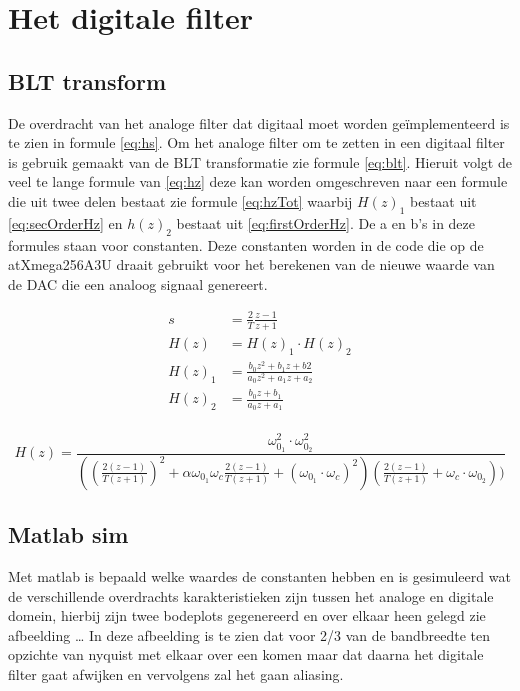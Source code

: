 \section{Het digitale filter}

\subsection{BLT transform}
\begin{minipage}{0.545\textwidth}
	De overdracht van het analoge filter dat digitaal moet worden geïmplementeerd is te zien in formule \ref{eq:hs}.
Om het analoge filter om te zetten in een digitaal filter is gebruik gemaakt van de BLT transformatie zie formule
\ref{eq:blt}. Hieruit volgt de veel te lange formule van \ref{eq:hz} deze kan worden omgeschreven naar een formule
die uit twee delen bestaat zie formule \ref{eq:hzTot} waarbij $H(z)_1$ bestaat uit \ref{eq:secOrderHz} en $h(z)_2$
bestaat uit \ref{eq:firstOrderHz}. De a en b's in deze formules staan voor constanten. Deze constanten worden
in de code die op de atXmega256A3U draait gebruikt voor het berekenen van de nieuwe waarde van de DAC die een 
analoog signaal genereert.
\end{minipage}
\begin{minipage}{0.45\textwidth}
	\begin{align}
		s&=\frac{2}{T}\frac{z-1}{z+1} \label{eq:blt}\\
		H(z)&=H(z)_1\cdot H(z)_2 \label{eq:hzTot}\\
		H(z)_1&=\frac{b_0z^2+b_1z+b2}{a_0z^2+a_1z+a_2} \label{eq:secOrderHz} \\
		H(z)_2&=\frac{b_0z+b_1}{a_0z+a_1} \label{eq:firstOrderHz}\\
	\end{align}
\end{minipage}
\begin{equation}
	H(z)=\frac{\omega_{0_1}^2\cdot \omega_{0_2}^2}{((\frac{2(z-1)}{T(z+1)})^2+\alpha\omega_{0_1}\omega_c\frac{2(z-1)}{T(z+1)}+(\omega_{0_1}\cdot\omega_c)^2)(\frac{2(z-1)}{T(z+1)} + \omega_c \cdot \omega_{0_2}))} \label{eq:hz}
\end{equation}

\subsection{Matlab sim}
Met matlab is bepaald welke waardes de constanten hebben en is gesimuleerd wat de verschillende overdrachts karakteristieken zijn tussen het 
analoge en digitale domein, hierbij zijn twee bodeplots gegenereerd en over elkaar heen gelegd zie afbeelding \dots
In deze afbeelding is te zien dat voor 2/3 van de bandbreedte ten opzichte van nyquist met elkaar over een komen maar dat daarna het digitale
filter gaat afwijken en vervolgens zal het gaan aliasing.

